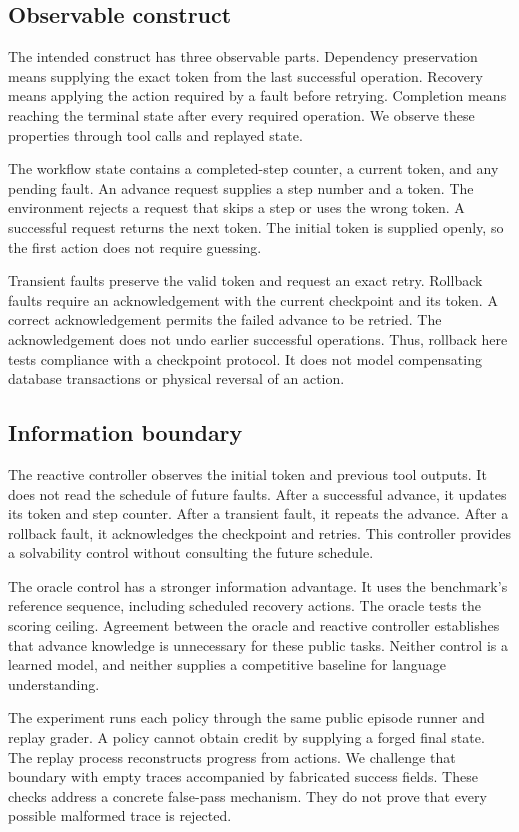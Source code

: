 \documentclass{article}
\begin{document}
\subsection{Observable construct}
The intended construct has three observable parts. Dependency preservation means supplying the exact token from the last successful operation. Recovery means applying the action required by a fault before retrying. Completion means reaching the terminal state after every required operation. We observe these properties through tool calls and replayed state.\par
The workflow state contains a completed-step counter, a current token, and any pending fault. An advance request supplies a step number and a token. The environment rejects a request that skips a step or uses the wrong token. A successful request returns the next token. The initial token is supplied openly, so the first action does not require guessing.\par
Transient faults preserve the valid token and request an exact retry. Rollback faults require an acknowledgement with the current checkpoint and its token. A correct acknowledgement permits the failed advance to be retried. The acknowledgement does not undo earlier successful operations. Thus, rollback here tests compliance with a checkpoint protocol. It does not model compensating database transactions or physical reversal of an action.\par
\subsection{Information boundary}
The reactive controller observes the initial token and previous tool outputs. It does not read the schedule of future faults. After a successful advance, it updates its token and step counter. After a transient fault, it repeats the advance. After a rollback fault, it acknowledges the checkpoint and retries. This controller provides a solvability control without consulting the future schedule.\par
The oracle control has a stronger information advantage. It uses the benchmark's reference sequence, including scheduled recovery actions. The oracle tests the scoring ceiling. Agreement between the oracle and reactive controller establishes that advance knowledge is unnecessary for these public tasks. Neither control is a learned model, and neither supplies a competitive baseline for language understanding.\par
The experiment runs each policy through the same public episode runner and replay grader. A policy cannot obtain credit by supplying a forged final state. The replay process reconstructs progress from actions. We challenge that boundary with empty traces accompanied by fabricated success fields. These checks address a concrete false-pass mechanism. They do not prove that every possible malformed trace is rejected.\par
\end{document}
